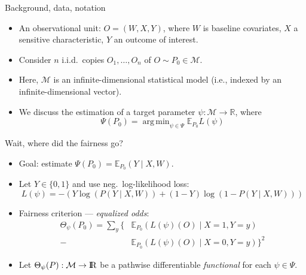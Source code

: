 \documentclass[12pt,t]{beamer}
\newcommand{\E}{\mathbb{E}}
\DeclareMathOperator*{\argmin}{arg\,min}
\newcommand{\openr}{\hbox{${\rm I\kern-.2em R}$}}
\begin{document}

\begin{frame}[c]{Background, data, notation}

\begin{center}
\begin{itemize}
  \itemsep12pt
  \item An observational unit: $O = (W, X, Y)$, where $W$ is baseline
    covariates, $X$ a sensitive characteristic, $Y$ an outcome of interest.
  \item Consider $n$ i.i.d.~copies $O_1, \ldots, O_n$ of $O \sim P_0 \in
    \mathcal{M}$.
  \item Here, $\mathcal{M}$ is an infinite-dimensional statistical model (i.e.,
    indexed by an infinite-dimensional vector).
  \item We discuss the estimation of a target parameter $\psi : \mathcal{M}
    \rightarrow \mathbb{R}$, where
    $$\Psi(P_0) = \argmin_{\psi \in \Psi} \E_{P_0}L(\psi)$$
\end{itemize}
\end{center}


\end{frame}


\begin{frame}[c]{Wait, where did the fairness go?}

\begin{center}
\begin{itemize}
  \itemsep12pt
  \item Goal: estimate $\Psi(P_0) = \E_{P_0}(Y \mid X, W)$.
  \item Let $Y \in \{0, 1\}$ and use neg.~log-likelihood loss:
    $$L(\psi) = -(Y \log(P(Y \mid X, W)) + (1 - Y) \log(1 - P(Y \mid X, W)))$$
  \item Fairness criterion --- \textit{equalized odds}:
    $$\begin{aligned}
      \Theta_{\psi}(P_0) = \sum_y \{&\E_{P_0}(L(\psi)(O) \mid X = 1, Y = y) \\ -
      &\E_{P_0}(L(\psi)(O) \mid X = 0, Y = y)\}^2
    \end{aligned}$$
  \item Let $\Theta_{\psi}(P): \mathcal{M} \rightarrow \openr$ be a pathwise
    differentiable \textit{functional} for each $\psi \in \Psi$.
\end{itemize}
\end{center}

\note{
}

\end{frame}
\end{document}
